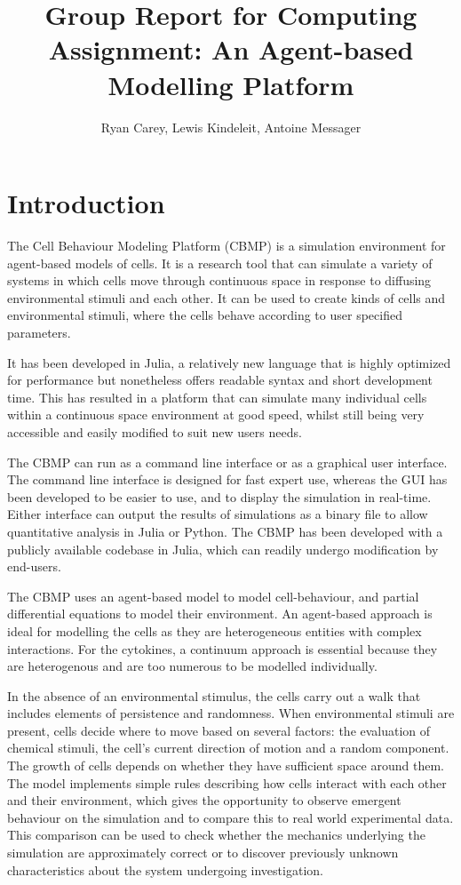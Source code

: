 \documentclass[12pt]{article}
\title{Group Report for Computing Assignment: An Agent-based Modelling Platform}
\author{Ryan Carey, Lewis Kindeleit, Antoine Messager}
\begin{document}
\maketitle

\newpage
\tableofcontents
\newpage

\section{Introduction}
The Cell Behaviour Modeling Platform (CBMP) is a simulation environment 
for agent-based models of cells. It is a research tool that can simulate 
a variety of systems in which cells move through continuous space in 
response to diffusing environmental stimuli and each other. It can be 
used to create kinds of cells and environmental stimuli, where the cells 
behave according to user specified parameters.

It has been developed in Julia, a relatively new language that is highly 
optimized for performance but nonetheless offers readable syntax and 
short development time. This has resulted in a platform that can 
simulate many individual cells within a continuous space environment at 
good speed, whilst still being very accessible and easily modified to 
suit new users needs.

The CBMP can run as a command line interface or as a graphical user 
interface. The command line interface is designed for fast expert use, 
whereas the GUI has been developed to be easier to use, and to display 
the simulation in real-time. Either interface can output the results of 
simulations as a binary file to allow quantitative analysis in Julia or 
Python. The CBMP has been developed with a publicly available codebase 
in Julia, which can readily undergo modification by end-users.

The CBMP uses an agent-based model to model cell-behaviour, and partial 
differential equations to model their environment. An agent-based 
approach is ideal for modelling the cells as they are heterogeneous 
entities with complex interactions. For the cytokines, a continuum 
approach is essential because they are heterogenous and are too numerous 
to be modelled individually.

In the absence of an environmental stimulus, the cells carry out a walk 
that includes elements of persistence and randomness. When environmental 
stimuli are present, cells decide where to move based on several 
factors: the evaluation of chemical stimuli, the cell's current 
direction of motion and a random component. The growth of cells depends 
on whether they have sufficient space around them. The model implements 
simple rules describing how cells interact with each other and their 
environment, which gives the opportunity to observe emergent behaviour 
on the simulation and to compare this to real world experimental data. 
This comparison can be used to check whether the mechanics underlying 
the simulation are approximately correct or to discover previously 
unknown characteristics about the system undergoing investigation.
\end{document}
